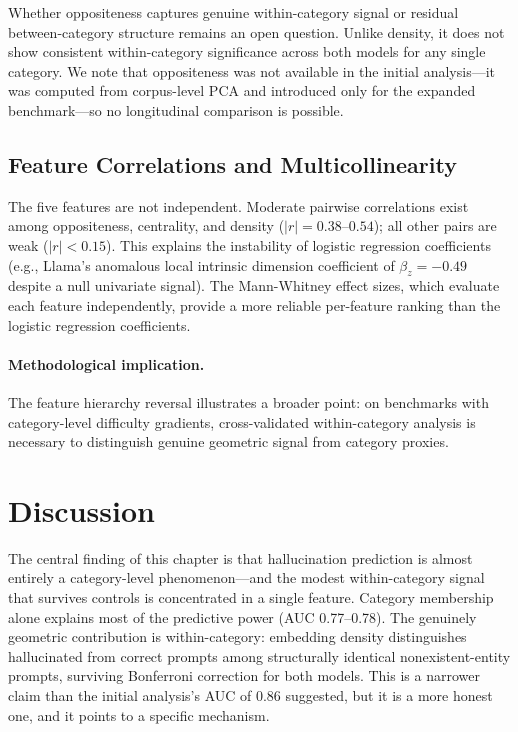 Whether oppositeness captures genuine within-category signal or residual between-category structure remains an open question. Unlike density, it does not show consistent within-category significance across both models for any single category. We note that oppositeness was not available in the initial analysis---it was computed from corpus-level PCA and introduced only for the expanded benchmark---so no longitudinal comparison is possible.

\subsection{Feature Correlations and Multicollinearity}
\label{sec:feature-correlations}

The five features are not independent. Moderate pairwise correlations exist among oppositeness, centrality, and density ($|r| = 0.38$--$0.54$); all other pairs are weak ($|r| < 0.15$). This explains the instability of logistic regression coefficients (e.g., Llama's anomalous local intrinsic dimension coefficient of $\beta_z = -0.49$ despite a null univariate signal). The Mann-Whitney effect sizes, which evaluate each feature independently, provide a more reliable per-feature ranking than the logistic regression coefficients.

\paragraph{Methodological implication.} The feature hierarchy reversal illustrates a broader point: on benchmarks with category-level difficulty gradients, cross-validated within-category analysis is necessary to distinguish genuine geometric signal from category proxies.

\section{Discussion}
\label{sec:ch5-discussion}

The central finding of this chapter is that hallucination prediction is almost entirely a category-level phenomenon---and the modest within-category signal that survives controls is concentrated in a single feature. Category membership alone explains most of the predictive power (AUC 0.77--0.78). The genuinely geometric contribution is within-category: embedding density distinguishes hallucinated from correct prompts among structurally identical nonexistent-entity prompts, surviving Bonferroni correction for both models. This is a narrower claim than the initial analysis's AUC of 0.86 suggested, but it is a more honest one, and it points to a specific mechanism.

